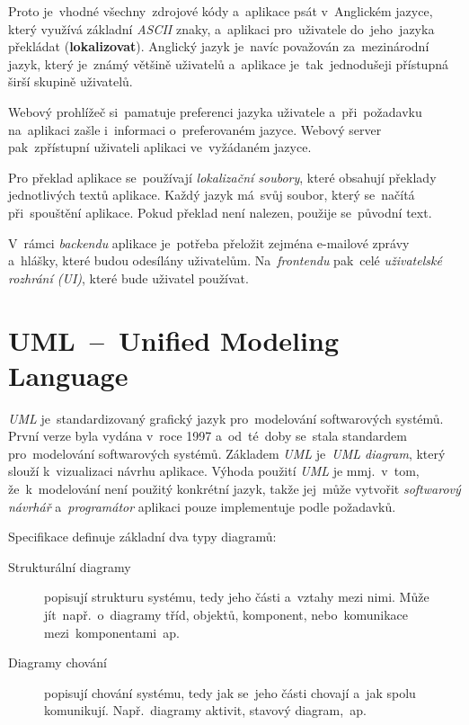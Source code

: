 \documentclass[11pt,a4paper]{report}
\begin{document}
            Proto je~vhodné všechny~zdrojové kódy a~aplikace psát v~Anglickém jazyce, který využívá základní \emph{ASCII} znaky, a~aplikaci pro~uživatele do~jeho~jazyka překládat (\textbf{lokalizovat}). Anglický jazyk je~navíc považován za~mezinárodní jazyk, který je~známý většině uživatelů a~aplikace je~tak~jednodušeji přístupná širší skupině uživatelů.
            
            Webový prohlížeč si~pamatuje preferenci jazyka uživatele a~při~požadavku na~aplikaci zašle i~informaci o~preferovaném jazyce. Webový server pak~zpřístupní uživateli aplikaci ve~vyžádaném jazyce.

            Pro překlad aplikace se~používají \emph{lokalizační soubory}, které obsahují překlady jednotlivých textů aplikace. Každý jazyk má~svůj soubor, který se~načítá při~spouštění aplikace. Pokud překlad není nalezen, použije se~původní text.

            V~rámci \emph{backendu} aplikace je~potřeba přeložit zejména e-mailové zprávy a~hlášky, které budou odesílány uživatelům. Na~\emph{frontendu} pak~celé \emph{uživatelské rozhrání (UI)}, které bude uživatel používat.

        \section{UML~--~Unified Modeling Language}
            \emph{UML} je~standardizovaný grafický jazyk pro~modelování softwarových systémů. První verze byla vydána v~roce 1997 a~od~té~doby se~stala standardem pro~modelování softwarových systémů. Základem \emph{UML} je~\emph{UML diagram}, který slouží k~vizualizaci návrhu aplikace. Výhoda použití \emph{UML} je mmj.~v~tom, že~k~modelování není použitý konkrétní jazyk, takže jej~může vytvořit \emph{softwarový návrhář} a~\emph{programátor} aplikaci pouze implementuje podle požadavků.
            
            Specifikace definuje základní dva typy diagramů:
            \begin{description}
                \item[Strukturální diagramy] popisují strukturu systému, tedy jeho části a~vztahy mezi nimi. Může jít~např.~o~diagramy tříd, objektů, komponent, nebo~komunikace mezi~komponentami~ap.
                \item[Diagramy chování] popisují chování systému, tedy jak se~jeho části chovají a~jak spolu komunikují. Např.~diagramy aktivit, stavový diagram,~ap.
            \end{description}
\end{document}
